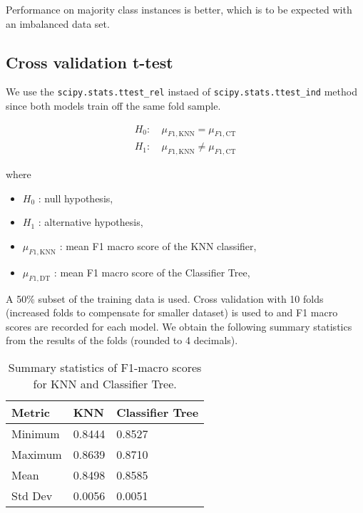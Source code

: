 \documentclass[conference]{IEEEtran}
\begin{document}
Performance on majority class instances is better, which is to be expected with an imbalanced data set.




\subsection{Cross validation t-test}

We use the \texttt{scipy.stats.ttest\_rel} instaed of \texttt{scipy.stats.ttest\_ind} method since both models train off the same fold sample.

\begin{align*}
	H_{0}:& \ \mu_{F1,\text{KNN}} = \mu_{F1,\text{CT}} \\[6pt]
	H_{1}:& \ \mu_{F1,\text{KNN}} \neq \mu_{F1,\text{CT}}
\end{align*}

where 
\begin{itemize}
	\item $H_{0}$ : null hypothesis,
	\item $H_{1}$ : alternative hypothesis,
	\item $\mu_{F1,\text{KNN}}$ : mean F1 macro score of the KNN classifier,
	\item $\mu_{F1,\text{DT}}$ : mean F1 macro score of the Classifier Tree,
\end{itemize}

A 50\% subset of the training data is used. Cross validation with 10 folds (increased folds to compensate for smaller dataset) is used to and F1 macro scores are recorded for each model. We obtain the following summary statistics from the results of the folds (rounded to 4 decimals).

\begin{table}[htbp]
	\centering
	\caption{Summary statistics of F1-macro scores for KNN and Classifier Tree.}
	\vspace{1mm}
	\begin{tabular}{lll}
		\toprule
		\textbf{Metric} & \textbf{KNN} & \textbf{Classifier Tree} \\
		\midrule
		Minimum    & 0.8444 & 0.8527 \\
		Maximum    & 0.8639 & 0.8710 \\
		Mean       & 0.8498 & 0.8585 \\
		Std Dev    & 0.0056 & 0.0051 \\
		\bottomrule
	\end{tabular}
	\label{tab:f1_summary}
\end{table}
\end{document}
